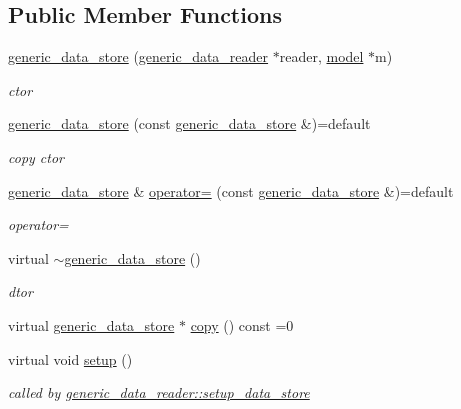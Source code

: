 \subsection*{Public Member Functions}
\begin{DoxyCompactItemize}
\item 
\hyperlink{classlbann_1_1generic__data__store_acbcd88161c06f4bb9a70bbae857d4ee0}{generic\+\_\+data\+\_\+store} (\hyperlink{classlbann_1_1generic__data__reader}{generic\+\_\+data\+\_\+reader} $\ast$reader, \hyperlink{classlbann_1_1model}{model} $\ast$m)
\begin{DoxyCompactList}\small\item\em ctor \end{DoxyCompactList}\item 
\hyperlink{classlbann_1_1generic__data__store_a0198154e411a4952c2536af390551d13}{generic\+\_\+data\+\_\+store} (const \hyperlink{classlbann_1_1generic__data__store}{generic\+\_\+data\+\_\+store} \&)=default
\begin{DoxyCompactList}\small\item\em copy ctor \end{DoxyCompactList}\item 
\hyperlink{classlbann_1_1generic__data__store}{generic\+\_\+data\+\_\+store} \& \hyperlink{classlbann_1_1generic__data__store_a680cf1fc618f6505a04255920ee7d7f2}{operator=} (const \hyperlink{classlbann_1_1generic__data__store}{generic\+\_\+data\+\_\+store} \&)=default
\begin{DoxyCompactList}\small\item\em operator= \end{DoxyCompactList}\item 
virtual \hyperlink{classlbann_1_1generic__data__store_ac8f202a6aa5a3c5007a9d7d53c687851}{$\sim$generic\+\_\+data\+\_\+store} ()
\begin{DoxyCompactList}\small\item\em dtor \end{DoxyCompactList}\item 
virtual \hyperlink{classlbann_1_1generic__data__store}{generic\+\_\+data\+\_\+store} $\ast$ \hyperlink{classlbann_1_1generic__data__store_ae06e089790aa023b839be508a3c020c6}{copy} () const =0
\item 
virtual void \hyperlink{classlbann_1_1generic__data__store_a1cff17def02ee21b6ca0befeb04bb582}{setup} ()
\begin{DoxyCompactList}\small\item\em called by \hyperlink{classlbann_1_1generic__data__reader_a8b2a09d38512fc11f1b9d572c89100a7}{generic\+\_\+data\+\_\+reader\+::setup\+\_\+data\+\_\+store} \end{DoxyCompactList}\item 

\end{DoxyCompactItemize}
